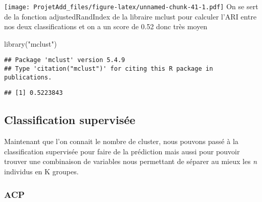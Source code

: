 \documentclass[
]{article}
\newenvironment{Shaded}{\begin{snugshade}}{\end{snugshade}}
\newcommand{\AttributeTok}[1]{\textcolor[rgb]{0.77,0.63,0.00}{#1}}
\newcommand{\DecValTok}[1]{\textcolor[rgb]{0.00,0.00,0.81}{#1}}
\newcommand{\FunctionTok}[1]{\textcolor[rgb]{0.00,0.00,0.00}{#1}}
\newcommand{\NormalTok}[1]{#1}
\newcommand{\SpecialCharTok}[1]{\textcolor[rgb]{0.00,0.00,0.00}{#1}}
\newcommand{\StringTok}[1]{\textcolor[rgb]{0.31,0.60,0.02}{#1}}
\begin{document}
\begin{Shaded}
\end{Shaded}

\texttt{[image: ProjetAdd\_files/figure-latex/unnamed-chunk-41-1.pdf]} On
se sert de la fonction adjustedRandIndex de la libraire mclust pour
calculer l'ARI entre nos deux classifications et on a un score de 0.52
donc très moyen

\begin{Shaded}
\begin{Highlighting}[]
\FunctionTok{library}\NormalTok{(}\StringTok{"mclust"}\NormalTok{)}
\end{Highlighting}
\end{Shaded}

\begin{verbatim}
## Package 'mclust' version 5.4.9
## Type 'citation("mclust")' for citing this R package in publications.
\end{verbatim}

\begin{Shaded}
\end{Shaded}

\begin{verbatim}
## [1] 0.5223843
\end{verbatim}

\hypertarget{classification-supervisuxe9e}{%
\subsection{Classification
supervisée}\label{classification-supervisuxe9e}}

Maintenant que l'on connait le nombre de cluster, nous pouvons passé à
la classification supervisée pour faire de la prédiction mais aussi pour
pouvoir trouver une combinaison de variables nous permettant de séparer
au mieux les \emph{n} individus en K groupes.

\hypertarget{acp}{%
\subsubsection{ACP}\label{acp}}
\end{document}
